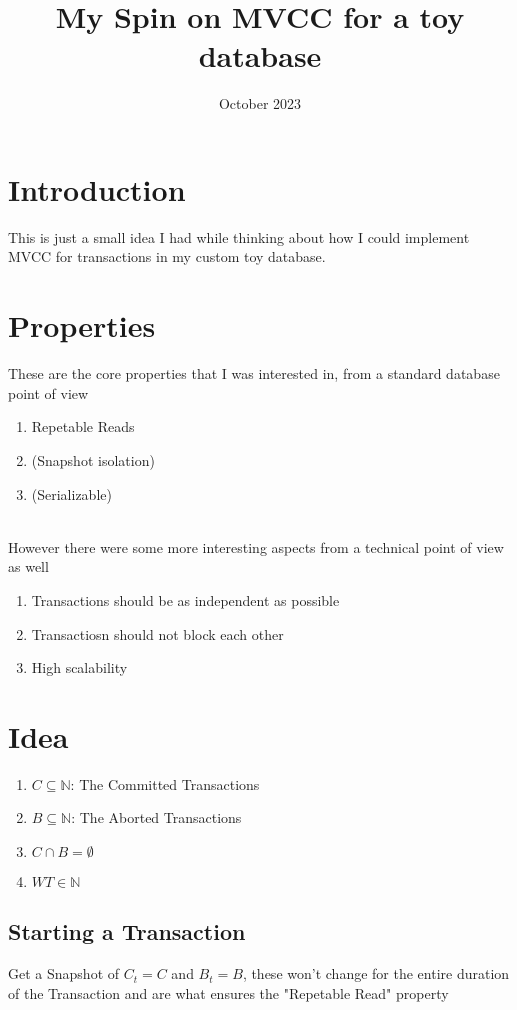 \documentclass[a4paper, 11pt]{article}
\title{My Spin on MVCC for a toy database}
\date{October 2023}
\begin{document}
\section{Introduction}
This is just a small idea I had while thinking about how I could implement MVCC for transactions in my custom
toy database.

\section{Properties}
These are the core properties that I was interested in, from a standard database point of view
\begin{enumerate}
\item Repetable Reads
\item (Snapshot isolation)
\item (Serializable)
\end{enumerate} \\
However there were some more interesting aspects from a technical point of view as well
\begin{enumerate}
\item Transactions should be as independent as possible
\item Transactiosn should not block each other
\item High scalability
\end{enumerate}

\section{Idea}
\begin{enumerate}
\item $C \subseteq \mathbb{N}$: The Committed Transactions
\item $B \subseteq \mathbb{N}$: The Aborted Transactions
\item $C \cap B = \emptyset$
\item $WT \in \mathbb{N}$
\end{enumerate}

\subsection{Starting a Transaction}
Get a Snapshot of $C_t = C$ and $B_t = B$, these won't change for the entire duration of the Transaction and are what
ensures the "Repetable Read" property
\end{document}
